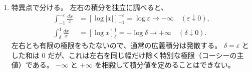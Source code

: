 \documentclass[a4paper,10pt,pdflatex,ja=standard,jafont=ipaex-type1,
  magstyle=real,scale=1]{bxjsarticle}
\newenvironment{problems}
  {\begin{enumerate}[leftmargin=2em,itemsep=3pt,topsep=3pt,parsep=0pt,
    font=\color{accent}]}
  {\end{enumerate}}
\newcommand{\examplelabel}[1]{{\sffamily\mdseries\color{ink}#1}}
\begin{document}
\begin{problems}
\item \examplelabel{特異点で分ける。}
左右の積分を独立に調べると、
$$
 \begin{aligned}
 \int_{-1}^{-\varepsilon}\frac{dx}{x}
 &=[\log|x|]_{-1}^{-\varepsilon}=\log\varepsilon
 \longrightarrow-\infty\quad(\varepsilon\downarrow0),\\
 \int_\delta^1\frac{dx}{x}
 &=[\log x]_\delta^1=-\log\delta
 \longrightarrow+\infty\quad(\delta\downarrow0).
 \end{aligned}
$$
左右とも有限の極限をもたないので、通常の広義積分は発散する。
$\delta=\varepsilon$ とした和は $0$ だが、これは左右を同じ幅だけ除く特別な極限（コーシーの主値）である。
$-\infty$ と $+\infty$ を相殺して積分値を定めることはできない。
\end{problems}
\end{document}
